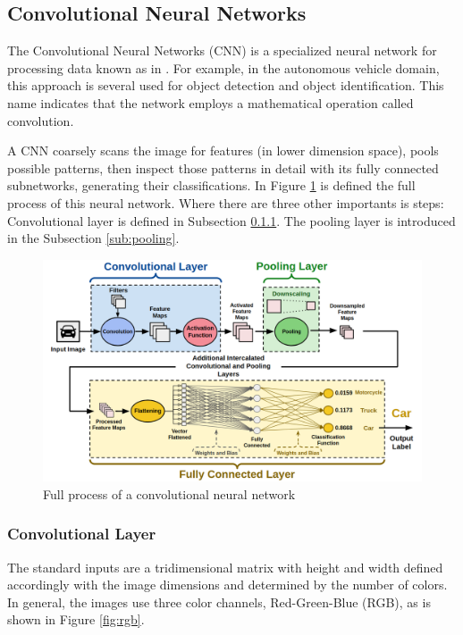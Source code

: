 \subsection{Convolutional Neural Networks}\label{sec:cnn}


The Convolutional Neural Networks (CNN) is a specialized neural network for processing data known as in \cite{lecun1995convolutional}. For example, in the autonomous vehicle domain, this approach is several used for object detection and object identification. This name  indicates that the network employs a mathematical operation called
convolution. 

A CNN coarsely scans the image for features (in lower dimension space), pools possible patterns, then inspect those patterns in detail with its fully connected
subnetworks, generating their classifications. In Figure \ref{fig:cnn_car} is defined the full process of this neural network. Where there are three other importants is steps: Convolutional layer is defined in Subsection \ref{sub:conv}. The pooling layer is introduced in the Subsection \ref{sub:pooling}.
\begin{figure}[H]
\centering
\includegraphics[width=\columnwidth]{imagens/Full_Process.png}
\caption{Full process of a convolutional neural network \cite{lecture}}
\label{fig:cnn_car}
\end{figure}


\subsubsection{Convolutional Layer}
\label{sub:conv}

The standard inputs are a tridimensional matrix with height and width defined accordingly with the image dimensions and determined by the number of colors. In general, the images use three color channels, Red-Green-Blue (RGB), as is shown in Figure \ref{fig:rgb}.

